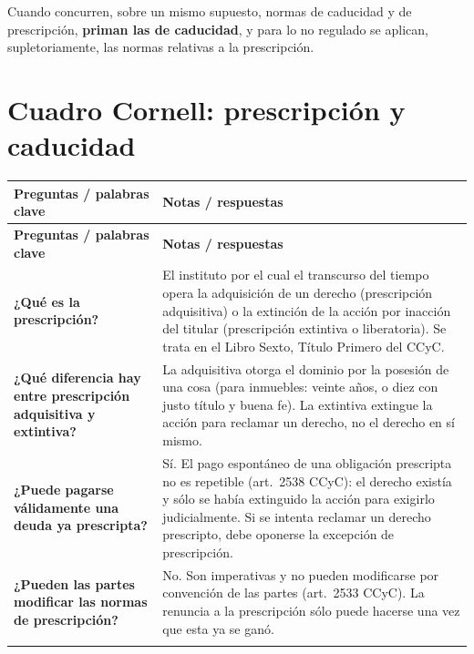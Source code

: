 \documentclass[12pt,oneside]{book}
\newlength{\cornellL}
\newlength{\cornellR}
\begin{document}
Cuando concurren, sobre un mismo supuesto, normas de caducidad y de prescripción, \textbf{priman las de caducidad}, y para lo no regulado se aplican, supletoriamente, las normas relativas a la prescripción.

\section{Cuadro Cornell: prescripción y caducidad}

{\renewcommand{\arraystretch}{1.2}
\begin{longtable}{
    >{\raggedright\arraybackslash}p{\cornellL}
    >{\raggedright\arraybackslash}p{\cornellR}
}
\toprule
\textbf{Preguntas / palabras clave} &
\textbf{Notas / respuestas} \\
\midrule
\endfirsthead

\toprule
\textbf{Preguntas / palabras clave} &
\textbf{Notas / respuestas} \\
\midrule
\endhead

\textbf{¿Qué es la prescripción?} &
El instituto por el cual el transcurso del tiempo opera la adquisición de un derecho (prescripción adquisitiva) o la extinción de la acción por inacción del titular (prescripción extintiva o liberatoria). Se trata en el Libro Sexto, Título Primero del CCyC. \\
\addlinespace

\textbf{¿Qué diferencia hay entre prescripción adquisitiva y extintiva?} &
La adquisitiva otorga el dominio por la posesión de una cosa (para inmuebles: veinte años, o diez con justo título y buena fe). La extintiva extingue la acción para reclamar un derecho, no el derecho en sí mismo. \\
\addlinespace

\textbf{¿Puede pagarse válidamente una deuda ya prescripta?} &
Sí. El pago espontáneo de una obligación prescripta no es repetible (art.~2538 CCyC): el derecho existía y sólo se había extinguido la acción para exigirlo judicialmente. Si se intenta reclamar un derecho prescripto, debe oponerse la excepción de prescripción. \\
\addlinespace

\textbf{¿Pueden las partes modificar las normas de prescripción?} &
No. Son imperativas y no pueden modificarse por convención de las partes (art.~2533 CCyC). La renuncia a la prescripción sólo puede hacerse una vez que esta ya se ganó. \\
\addlinespace


\end{longtable}}
\end{document}
